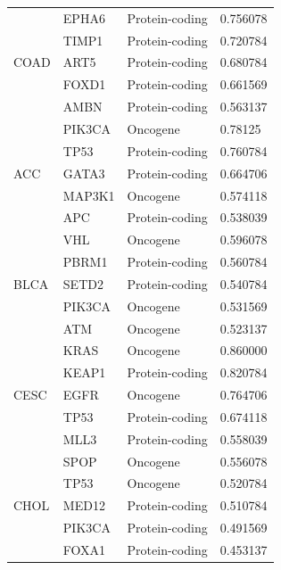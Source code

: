 \begin{table}
\begin{center}
{\begin{tabular}{l|l|l|l}
        \midrule
        \multirow{5}{*}{COAD}& EPHA6 & Protein-coding & 0.756078 \\ %
        & TIMP1 & Protein-coding & 0.720784 \\ %
        & ART5 & Protein-coding & 0.680784 \\ %
        & FOXD1 & Protein-coding & 0.661569 \\ %
        & AMBN & Protein-coding & 0.563137 \\ %
        \midrule
        \multirow{5}{*}{ACC} & PIK3CA & Oncogene & 0.78125 \\ %
        & TP53 & Protein-coding & 0.760784 \\ %
        & GATA3  & Protein-coding & 0.664706 \\ %
        & MAP3K1  & Oncogene & 0.574118 \\ %
        & APC   & Protein-coding & 0.538039 \\ 
        \midrule
        \multirow{5}{*}{BLCA} & VHL & Oncogene & 0.596078 \\ %
        & PBRM1 & Protein-coding  & 0.560784 \\ %
        & SETD2 & Protein-coding & 0.540784 \\ %
        & PIK3CA & Oncogene & 0.531569 \\ %
        & ATM & Oncogene & 0.523137 \\ %
        \midrule
        \multirow{5}{*}{CESC}& KRAS & Oncogene & 0.860000 \\ %
        & KEAP1 & Protein-coding & 0.820784 \\ %
        & EGFR & Oncogene & 0.764706 \\ %
        & TP53 & Protein-coding & 0.674118 \\ %
        & MLL3 & Protein-coding & 0.558039 \\ %
        \midrule
        \multirow{5}{*}{CHOL}& SPOP & Oncogene & 0.556078 \\ %
        & TP53 & Oncogene & 0.520784 \\ %
        & MED12 & Protein-coding & 0.510784 \\ %
        & PIK3CA & Protein-coding & 0.491569 \\ %
        & FOXA1 & Protein-coding & 0.453137 \\ %

\end{tabular}}
\end{center}
\end{table}
